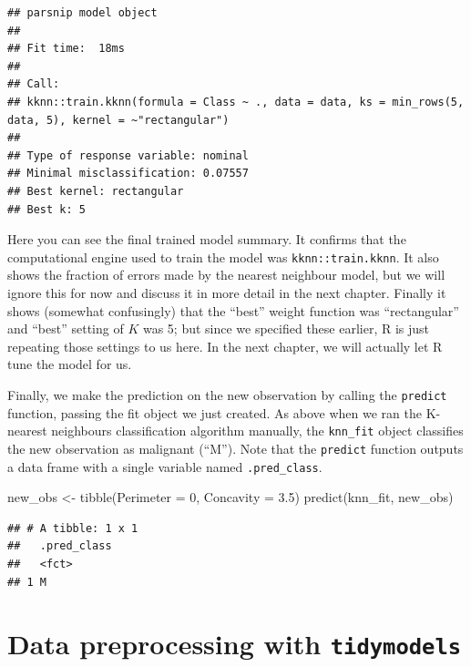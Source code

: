 \documentclass[
]{krantz}
\makeatletter
\newenvironment{Shaded}{\begin{snugshade}}{\end{snugshade}}
\newcommand{\AttributeTok}[1]{\textcolor[rgb]{0.61,0.61,0.61}{#1}}
\newcommand{\DecValTok}[1]{\textcolor[rgb]{0.06,0.06,0.06}{#1}}
\newcommand{\FloatTok}[1]{\textcolor[rgb]{0.06,0.06,0.06}{#1}}
\newcommand{\FunctionTok}[1]{\textcolor[rgb]{0,0,0}{#1}}
\newcommand{\NormalTok}[1]{#1}
\newcommand{\OtherTok}[1]{\textcolor[rgb]{0.37,0.37,0.37}{#1}}
\newenvironment{kframe}{%
\medskip{}
\setlength{\fboxsep}{.8em}
 \def\at@end@of@kframe{}%
 \ifinner\ifhmode%
  \def\at@end@of@kframe{\end{minipage}}%
  \begin{minipage}{\columnwidth}%
 \fi\fi%
 \def\FrameCommand##1{\hskip\@totalleftmargin \hskip-\fboxsep
 \colorbox{shadecolor}{##1}\hskip-\fboxsep
     \hskip-\linewidth \hskip-\@totalleftmargin \hskip\columnwidth}%
 \MakeFramed {\advance\hsize-\width
   \@totalleftmargin\z@ \linewidth\hsize
   \@setminipage}}%
 {\par\unskip\endMakeFramed%
 \at@end@of@kframe}
\renewenvironment{Shaded}{\begin{kframe}}{\end{kframe}}
\makeatother
\begin{document}
\begin{verbatim}
## parsnip model object
## 
## Fit time:  18ms 
## 
## Call:
## kknn::train.kknn(formula = Class ~ ., data = data, ks = min_rows(5,     data, 5), kernel = ~"rectangular")
## 
## Type of response variable: nominal
## Minimal misclassification: 0.07557
## Best kernel: rectangular
## Best k: 5
\end{verbatim}

Here you can see the final trained model summary. It confirms that the computational engine used
to train the model was \texttt{kknn::train.kknn}. It also shows the fraction of errors made by
the nearest neighbour model, but we will ignore this for now and discuss it in more detail
in the next chapter.
Finally it shows (somewhat confusingly) that the ``best'' weight function
was ``rectangular'' and ``best'' setting of \(K\) was 5; but since we specified these earlier,
R is just repeating those settings to us here. In the next chapter, we will actually
let R tune the model for us.

Finally, we make the prediction on the new observation by calling the \texttt{predict} function,
passing the fit object we just created. As above when we ran the K-nearest neighbours
classification algorithm manually, the \texttt{knn\_fit} object classifies the new observation as
malignant (``M''). Note that the \texttt{predict} function outputs a data frame with a single
variable named \texttt{.pred\_class}.

\begin{Shaded}
\begin{Highlighting}[]
\NormalTok{new\_obs }\OtherTok{\textless{}{-}} \FunctionTok{tibble}\NormalTok{(}\AttributeTok{Perimeter =} \DecValTok{0}\NormalTok{, }\AttributeTok{Concavity =} \FloatTok{3.5}\NormalTok{)}
\FunctionTok{predict}\NormalTok{(knn\_fit, new\_obs)}
\end{Highlighting}
\end{Shaded}

\begin{verbatim}
## # A tibble: 1 x 1
##   .pred_class
##   <fct>      
## 1 M
\end{verbatim}

\hypertarget{data-preprocessing-with-tidymodels}{%
\section{\texorpdfstring{Data preprocessing with \texttt{tidymodels}}{Data preprocessing with tidymodels}}\label{data-preprocessing-with-tidymodels}}
\end{document}
